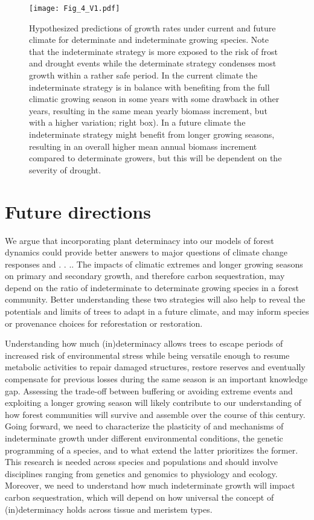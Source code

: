 \documentclass{article}
\begin{document}
	
								\begin{figure}
								\centering
								\texttt{[image: Fig\_4\_V1.pdf]} 
								\caption{Hypothesized predictions of growth rates under current and future climate for determinate and indeterminate growing species. Note that the indeterminate strategy is more exposed to the risk of frost and drought events while the determinate strategy condenses most growth within a rather safe period. In the current climate the indeterminate strategy is in balance with benefiting from the full climatic growing season in some years with some drawback in other years, resulting in the same mean yearly biomass increment, but with a higher variation; right box). In a future climate the indeterminate strategy might benefit from longer growing seasons, resulting in an overall higher mean annual biomass increment compared to determinate growers, but this will be dependent on the severity of drought.}
								\label{fig:fig_4xxx}
							\end{figure}
	\pagebreak
\section*{Future directions}
We argue that incorporating plant determinacy into our models of forest dynamics could provide better answers to major questions of climate change responses and . . .. The impacts of climatic extremes and longer growing seasons on primary and secondary growth, and therefore carbon sequestration, may depend on the ratio of indeterminate to determinate growing species in a forest community. Better understanding these two strategies will also help to reveal the potentials and limits of trees to adapt in a future climate, and may inform species or provenance choices for reforestation or restoration.

Understanding how much (in)determinacy allows trees to escape periods of increased risk of environmental stress while being versatile enough to resume metabolic activities to repair damaged structures, restore reserves and eventually compensate for previous losses during the same season is an important knowledge gap. Assessing the trade-off between buffering or avoiding extreme events and exploiting a longer growing season will likely contribute to our understanding of how forest communities will survive and assemble over the course of this century.\\

Going forward, we need to characterize the plasticity of and mechanisms of indeterminate growth under different environmental conditions, the genetic programming of a species, and to what extend the latter prioritizes the former. This research is needed across species and populations and should involve disciplines ranging from genetics and genomics to physiology and ecology. Moreover, we need to understand how much indeterminate growth will impact carbon sequestration, which will depend on how universal the concept of (in)determinacy holds across tissue and meristem types.
\end{document}
